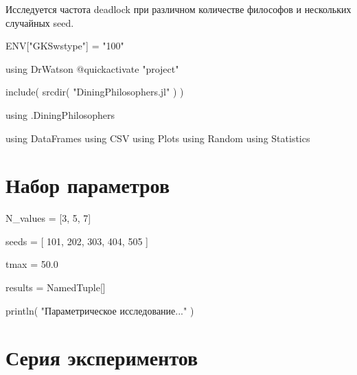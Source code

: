 \documentclass[
  english,
  russian,
  12pt,
  a4paper,
  DIV=11,
  numbers=noendperiod]{scrreprt}
\newenvironment{Shaded}{\begin{snugshade}}{\end{snugshade}}
\newcommand{\BuiltInTok}[1]{\textcolor[rgb]{0.00,0.23,0.31}{#1}}
\newcommand{\ConstantTok}[1]{\textcolor[rgb]{0.56,0.35,0.01}{#1}}
\newcommand{\DataTypeTok}[1]{\textcolor[rgb]{0.68,0.00,0.00}{#1}}
\newcommand{\FloatTok}[1]{\textcolor[rgb]{0.68,0.00,0.00}{#1}}
\newcommand{\FunctionTok}[1]{\textcolor[rgb]{0.28,0.35,0.67}{#1}}
\newcommand{\ImportTok}[1]{\textcolor[rgb]{0.00,0.46,0.62}{#1}}
\newcommand{\NormalTok}[1]{\textcolor[rgb]{0.00,0.23,0.31}{#1}}
\newcommand{\OperatorTok}[1]{\textcolor[rgb]{0.37,0.37,0.37}{#1}}
\newcommand{\PreprocessorTok}[1]{\textcolor[rgb]{0.68,0.00,0.00}{#1}}
\newcommand{\StringTok}[1]{\textcolor[rgb]{0.13,0.47,0.30}{#1}}
\begin{document}
Исследуется частота deadlock при различном количестве философов и
нескольких случайных seed.

\begin{Shaded}
\begin{Highlighting}[]
\ConstantTok{ENV}\NormalTok{[}\StringTok{"GKSwstype"}\NormalTok{] }\OperatorTok{=} \StringTok{"100"}

\ImportTok{using} \BuiltInTok{DrWatson}
\PreprocessorTok{@quickactivate} \StringTok{"project"}

\FunctionTok{include}\NormalTok{(}
    \FunctionTok{srcdir}\NormalTok{(}
        \StringTok{"DiningPhilosophers.jl"}
\NormalTok{    )}
\NormalTok{)}

\ImportTok{using} \BuiltInTok{.DiningPhilosophers}

\ImportTok{using} \BuiltInTok{DataFrames}
\ImportTok{using} \BuiltInTok{CSV}
\ImportTok{using} \BuiltInTok{Plots}
\ImportTok{using} \BuiltInTok{Random}
\ImportTok{using} \BuiltInTok{Statistics}
\end{Highlighting}
\end{Shaded}

\section{Набор
параметров}\label{ux43dux430ux431ux43eux440-ux43fux430ux440ux430ux43cux435ux442ux440ux43eux432}

\begin{Shaded}
\begin{Highlighting}[]
\NormalTok{N\_values }\OperatorTok{=}
\NormalTok{    [}\FloatTok{3}\NormalTok{, }\FloatTok{5}\NormalTok{, }\FloatTok{7}\NormalTok{]}

\NormalTok{seeds }\OperatorTok{=}
\NormalTok{    [}
        \FloatTok{101}\NormalTok{,}
        \FloatTok{202}\NormalTok{,}
        \FloatTok{303}\NormalTok{,}
        \FloatTok{404}\NormalTok{,}
        \FloatTok{505}
\NormalTok{    ]}

\NormalTok{tmax }\OperatorTok{=}
    \FloatTok{50.0}

\NormalTok{results }\OperatorTok{=}
    \DataTypeTok{NamedTuple}\NormalTok{[]}

\FunctionTok{println}\NormalTok{(}
    \StringTok{"Параметрическое исследование..."}
\NormalTok{)}
\end{Highlighting}
\end{Shaded}

\section{Серия
экспериментов}\label{ux441ux435ux440ux438ux44f-ux44dux43aux441ux43fux435ux440ux438ux43cux435ux43dux442ux43eux432}
\end{document}
